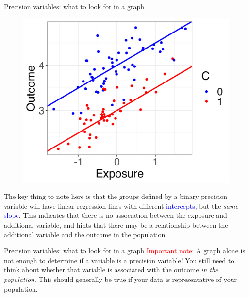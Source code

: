 \documentclass[10pt,t]{beamer}
\begin{document}
\begin{frame}{Precision variables: what to look for in a graph}
\begin{figure}
	\centering \includegraphics[scale=0.4]{p7.png}
\end{figure}

\vspace{0.3cm}

The key thing to note here is that the groups defined by a binary precision variable will have linear regression lines with different \textcolor{blue}{intercepts}, but the \textit{same} \textcolor{blue}{slope}. This indicates that there is no association between the exposure and additional variable, and hints that there may be a relationship between the additional variable and the outcome in the population. 
\end{frame}

\begin{frame}{Precision variables: what to look for in a graph}
\textcolor{red}{Important note}: A graph alone is not enough to determine if a variable is a precision variable! You still need to think about whether that variable is associated with the outcome \textit{in the population}. This should generally be true if your data is representative of your population.
\end{frame}
\end{document}
